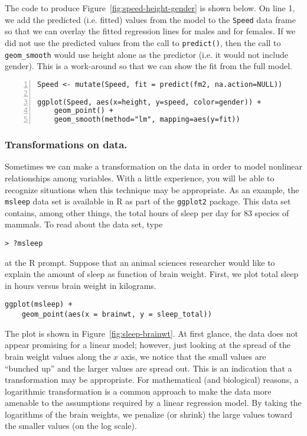 The code to produce Figure~\ref{fig:speed-height-gender} is shown
below.  On line 1, we add the predicted (i.e. fitted) values from the
model to the \texttt{Speed} data frame so that we can overlay the
fitted regression lines for males and for females.  If we did not use
the predicted values from the call to \texttt{predict()}, then the
call to \texttt{geom\_smooth} would use height alone as the predictor
(i.e. it would not include gender).  This is a work-around so that we
can show the fit from the full model.

\begin{Verbatim}[numbers=left,xleftmargin=5mm,samepage=true]
Speed <- mutate(Speed, fit = predict(fm2, na.action=NULL))

ggplot(Speed, aes(x=height, y=speed, color=gender)) +
    geom_point() +
    geom_smooth(method="lm", mapping=aes(y=fit))
\end{Verbatim}


\subsubsection*{Transformations on data.}

Sometimes we can make a transformation on the data in order to model
nonlinear relationships among variables. With a little experience, you
will be able to recognize situations when this technique may be
appropriate. As an example, the \texttt{msleep} data set is available
in R as part of the \texttt{ggplot2} package.  This data set contains,
among other things, the total hours of sleep per day for 83 species of
mammals. To read about the data set, type
\begin{Verbatim}
> ?msleep
\end{Verbatim}
at the R prompt. Suppose that an animal sciences researcher would like
to explain the amount of sleep as function of brain weight. First, we
plot total sleep in hours versus brain weight in kilograms.

\begin{Verbatim}[samepage=true]
ggplot(msleep) +
    geom_point(aes(x = brainwt, y = sleep_total))
\end{Verbatim}

The plot is shown in Figure~\ref{fig:sleep-brainwt}. At first glance, the
data does not appear promising for a linear model; however, just
looking at the spread of the brain weight values along the $x$ axis,
we notice that the small values are ``bunched up'' and the larger
values are spread out.  This is an indication that a transformation
may be appropriate. For mathematical (and biological) reasons, a
logarithmic transformation is a common approach to make the data more amenable
to the assumptions required by a linear regression model.  By taking the
logarithms of the brain weights, we penalize (or shrink) the large values
toward the smaller values (on the log scale). 

